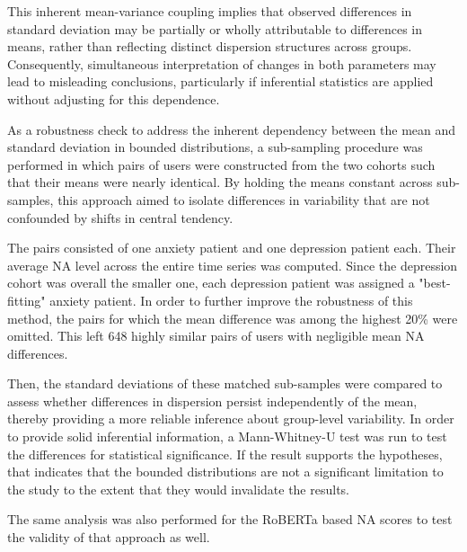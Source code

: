 This inherent mean-variance coupling implies that observed differences in standard deviation may be partially or wholly attributable to differences in means, rather than reflecting distinct dispersion structures across groups. Consequently, simultaneous interpretation of changes in both parameters may lead to misleading conclusions, particularly if inferential statistics are applied without adjusting for this dependence.

As a robustness check to address the inherent dependency between the mean and standard deviation in bounded distributions, a sub-sampling procedure was performed in which pairs of users were constructed from the two cohorts such that their means were nearly identical. By holding the means constant across sub-samples, this approach aimed to isolate differences in variability that are not confounded by shifts in central tendency. 

The pairs consisted of one anxiety patient and one depression patient each. Their average NA level across the entire time series was computed. Since the depression cohort was overall the smaller one, each depression patient was assigned a "best-fitting" anxiety patient. In order to further improve the robustness of this method, the pairs for which the mean difference was among the highest 20\% were omitted. This left 648 highly similar pairs of users with negligible mean NA differences.

Then, the standard deviations of these matched sub-samples were compared to assess whether differences in dispersion persist independently of the mean, thereby providing a more reliable inference about group-level variability. In order to provide solid inferential information, a Mann-Whitney-U test was run to test the differences for statistical significance. If the result supports the hypotheses, that indicates that the bounded distributions are not a significant limitation to the study to the extent that they would invalidate the results.

The same analysis was also performed for the RoBERTa based NA scores to test the validity of that approach as well.